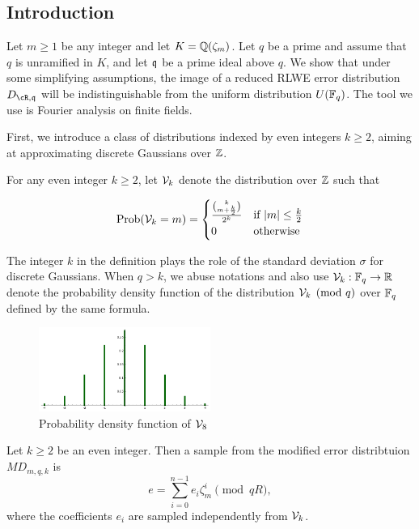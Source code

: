 \documentclass{amsart}
\begin{document}
\subsection{Introduction}

Let $m \geq 1$ be any integer and let $K = \mathbb{Q}(\zeta_m)$. Let $q$ be a prime and assume that $q$ is unramified in $K$, and let $\mathfrak{q}$ be a prime ideal above $q$. We show that under some simplifying assumptions, the image of a reduced RLWE error distribution $D_{\cR,\fq}$ will be indistinguishable from the uniform distribution $U(\mathbb{F}_q)$. The tool we use is Fourier analysis on finite fields.

First, we introduce a class of distributions indexed by even integers $k \geq 2$, aiming at approximating discrete Gaussians over $\mathbb{Z}$.
\begin{Definition}
For any even integer $k \geq 2$, let $\mathcal{V}_k$ denote the distribution over $\mathbb{Z}$ such that

$$\operatorname{Prob}(\mathcal{V}_k = m) =  \begin{cases} \frac{{k \choose m+\frac{k}{2}}}{2^k} &\mbox{if } |m| \leq \frac{k}{2} \\
0 & \mbox{otherwise}  \end{cases}$$

\end{Definition}
The integer $k$ in the definition plays the role of the standard deviation $\sigma$ for discrete Gaussians. When $q > k$, we abuse notations and also use $\mathcal{V}_k: \mathbb{F}_q \to \mathbb{R}$ denote the probability density function of the distribution $\mathcal{V}_k \pmod {q}$ over $\mathbb{F}_q$ defined by the same formula.

\begin{figure}[h!]
\centering
\includegraphics[width = 0.5\textwidth]{v8.png}
\caption{Probability density function of $\mathcal{V}_8$}
\end{figure}


\begin{Definition}
Let $k \geq 2$ be an even integer. Then a sample from the modified error distribtuion $MD_{m,q,k}$ is
\[
    e = \sum_{i=0}^{n-1} e_i \zeta_m^{i} \pmod{qR},
\]
where the coefficients $e_i$ are sampled independently from $\mathcal{V}_k$.
\end{Definition}
\end{document}
